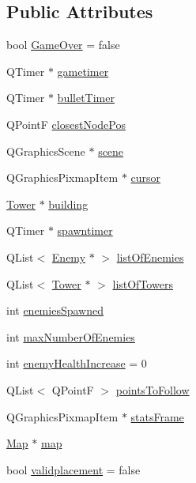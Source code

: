 \subsection*{Public Attributes}
\begin{DoxyCompactItemize}
\item 
bool \hyperlink{class_game_ad08e48fb0fbd89fe67ccb42ff8e8fff1}{Game\+Over} = false
\item 
Q\+Timer $\ast$ \hyperlink{class_game_a8feee9081542b15a9f2d889a6f1c8257}{gametimer}
\item 
Q\+Timer $\ast$ \hyperlink{class_game_a4774e6e02e372dabcba313802800df5d}{bullet\+Timer}
\item 
Q\+PointF \hyperlink{class_game_a861bf240380d110b285659d8af3f0406}{closest\+Node\+Pos}
\item 
Q\+Graphics\+Scene $\ast$ \hyperlink{class_game_a8119e3b9a632906c6808fa294b46a92a}{scene}
\item 
Q\+Graphics\+Pixmap\+Item $\ast$ \hyperlink{class_game_ac8bde3bd16f503846f66bbb866c3b7b9}{cursor}
\item 
\hyperlink{class_tower}{Tower} $\ast$ \hyperlink{class_game_a5917b4e021a93be7666ebc2ef4529401}{building}
\item 
Q\+Timer $\ast$ \hyperlink{class_game_a4a8895723160ca3585fe140e476aea1f}{spawntimer}
\item 
Q\+List$<$ \hyperlink{class_enemy}{Enemy} $\ast$ $>$ \hyperlink{class_game_ab96914bfc1e59035233105abfb0787fe}{list\+Of\+Enemies}
\item 
Q\+List$<$ \hyperlink{class_tower}{Tower} $\ast$ $>$ \hyperlink{class_game_aa0614c45667257e5be61685c33a2bec6}{list\+Of\+Towers}
\item 
int \hyperlink{class_game_a6ac18c388eda83ceb3212e099b3b8473}{enemies\+Spawned}
\item 
int \hyperlink{class_game_aaee1756450bae685777ee86c45ef4f78}{max\+Number\+Of\+Enemies}
\item 
int \hyperlink{class_game_ac0038cbbcfbd5d8b32600cd9f42cd09b}{enemy\+Health\+Increase} = 0
\item 
Q\+List$<$ Q\+PointF $>$ \hyperlink{class_game_abe95b23433c0353887099928a5573c59}{points\+To\+Follow}
\item 
Q\+Graphics\+Pixmap\+Item $\ast$ \hyperlink{class_game_a3b40718d348c0f12af63a3f428924ab4}{stats\+Frame}
\item 
\hyperlink{class_map}{Map} $\ast$ \hyperlink{class_game_acef3a39fdf14be2c980b0dc11e7be402}{map}
\item 
bool \hyperlink{class_game_a06579845b7a93d8bf40efe5e7592b601}{validplacement} = false

\end{DoxyCompactItemize}
